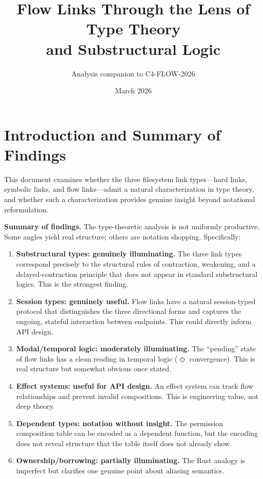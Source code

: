 \documentclass[11pt]{article}
\title{Flow Links Through the Lens of Type Theory\\and Substructural Logic}
\author{Analysis companion to C4-FLOW-2026}
\date{March 2026}
\newcommand{\eventually}{\Diamond}
\begin{document}
\maketitle

\tableofcontents
\bigskip

\section{Introduction and Summary of Findings}

This document examines whether the three filesystem link types---hard links,
symbolic links, and flow links---admit a natural characterization in type
theory, and whether such a characterization provides genuine insight beyond
notational reformulation.

\textbf{Summary of findings.} The type-theoretic analysis is not uniformly
productive. Some angles yield real structure; others are notation shopping.
Specifically:

\begin{enumerate}[label=(\roman*)]
  \item \textbf{Substructural types: genuinely illuminating.} The three link
    types correspond precisely to the structural rules of contraction,
    weakening, and a delayed-contraction principle that does not appear in
    standard substructural logics. This is the strongest finding.
  \item \textbf{Session types: genuinely useful.} Flow links have a natural
    session-typed protocol that distinguishes the three directional forms and
    captures the ongoing, stateful interaction between endpoints. This could
    directly inform API design.
  \item \textbf{Modal/temporal logic: moderately illuminating.} The ``pending''
    state of flow links has a clean reading in temporal logic ($\eventually$
    convergence). This is real structure but somewhat obvious once stated.
  \item \textbf{Effect systems: useful for API design.} An effect system can
    track flow relationships and prevent invalid compositions. This is
    engineering value, not deep theory.
  \item \textbf{Dependent types: notation without insight.} The permission
    composition table can be encoded as a dependent function, but the encoding
    does not reveal structure that the table itself does not already show.
  \item \textbf{Ownership/borrowing: partially illuminating.} The Rust analogy
    is imperfect but clarifies one genuine point about aliasing semantics.
\end{enumerate}
\end{document}
